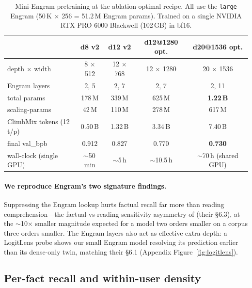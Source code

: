 \documentclass[11pt]{article}
\begin{document}
\begin{table}[t]
  \centering
  \caption{Mini-Engram pretraining at the ablation-optimal recipe.
  All use the \texttt{large} Engram (50\,K $\times$ 256 = 51.2\,M
  Engram params). Trained on a single NVIDIA RTX PRO 6000 Blackwell
  (102\,GB) in bf16.}
  \label{tab:miniengram}
  \begin{tabular}{lcccc}
    \toprule
     & d8 v2 & d12 v2 & \textbf{d12@1280 opt.} & \textbf{d20@1536 opt.} \\
    \midrule
    depth $\times$ width   & 8 $\times$ 512  & 12 $\times$ 768 & 12 $\times$ 1280 & 20 $\times$ 1536 \\
    Engram layers          & 2, 5            & 2, 7            & 2, 7             & 2, 11 \\
    total params           & 178\,M          & 339\,M          & 625\,M           & \textbf{1.22\,B} \\
    scaling-params         & 42\,M           & 110\,M          & 278\,M           & 617\,M \\
    ClimbMix tokens (12 t/p)& 0.50\,B         & 1.32\,B         & 3.34\,B          & 7.40\,B \\
    final val\_bpb         & 0.912           & 0.827           & 0.770            & \textbf{0.730} \\
    wall-clock (single GPU)& $\sim$50\,min   & $\sim$5\,h      & $\sim$10.5\,h    & $\sim$70\,h (shared GPU) \\
    \bottomrule
  \end{tabular}
\end{table}

\paragraph{We reproduce Engram's two signature findings.}
Suppressing the Engram lookup hurts factual recall far more than
reading comprehension---the factual-vs-reading sensitivity
asymmetry of \citet{cheng2026engram} (their \S6.3), at the
$\sim$10$\times$ smaller magnitude expected for a model two
orders smaller on a corpus three orders smaller. The Engram
layers also act as effective extra depth: a LogitLens probe shows
our small Engram model resolving its prediction earlier than its
dense-only twin, matching their \S6.1 (Appendix
Figure~\ref{fig:logitlens}).

\subsection{Per-fact recall and within-user density}
\label{sec:density}
\label{sec:single-fact}
\end{document}
